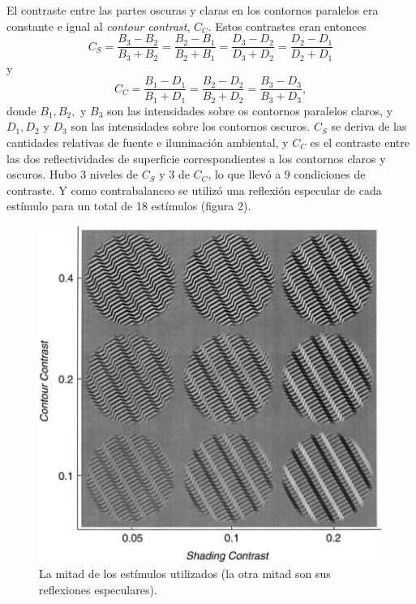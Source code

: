 \documentclass[a4paper,12pt]{article}
\begin{document}
El contraste entre las partes oscuras y claras en los contornos paralelos era constante e igual al {\itshape contour contrast}, $C_{C}$. Estos contrastes eran entonces
\begin{equation}
	C_{S}
	=
	\frac{
		B_{3}-B_{2}
	}{
		B_{3}+B_{2}
	}
	=
	\frac{
		B_{2}-B_{1}
	}{
		B_{2}+B_{1}
	}
	=
	\frac{
		D_{3}-D_{2}
	}{
		D_{3}+D_{2}
	}
	=
	\frac{
		D_{2}-D_{1}
	}{
		D_{2}+D_{1}
	}
\end{equation}
y
\begin{equation}
	C_{C}
	=
	\frac{
		B_{1}-D_{1}
	}{
		B_{1}+D_{1}
	}
	=
	\frac{
		B_{2}-D_{2}
	}{
		B_{2}+D_{2}
	}
	=
	\frac{
		B_{3}-D_{3}
	}{
		B_{3}+D_{3}
	},
\end{equation}
donde $B_{1}, B_{2},$ y $B_{3}$ son las intensidades sobre os contornos paralelos claros, y $D_{1}, D_{2}$ y $D_{3}$ son las intensidades sobre los contornos oscuros. $C_{S}$ se deriva de las cantidades relativas de fuente e iluminación ambiental, y $C_{C}$ es el contraste entre las dos reflectividades de superficie correspondientes a los contornos claros y oscuros. Hubo 3 niveles de $C_{S}$ y 3 de $C_{C}$, lo que llevó a 9 condiciones de contraste. Y como contrabalanceo se utilizó una reflexión especular de cada estímulo para un total de 18 estímulos (figura 2).

\begin{figure}[hb]
	\begin{center}
		\includegraphics[scale=0.5]{Mamassian2001a(2).png}
		\caption{La mitad de los estímulos utilizados (la otra mitad son sus reflexiones especulares).}
	\end{center}	
\end{figure}
\end{document}
